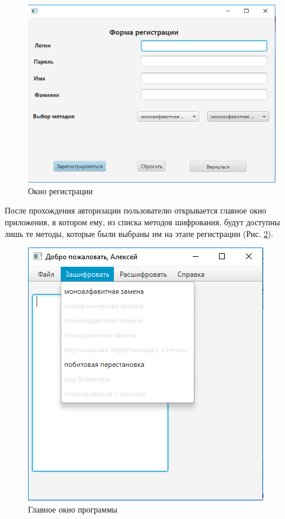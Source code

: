 \documentclass[a4paper,12pt]{article}
\begin{document}
\begin{center}
	\begin{figure}[h!]
		\centering
   		\includegraphics[scale=0.5]{img/registry_form.png}
   		\caption{Окно регистрации}
   		\label{fig:registry_form}
    \end{figure}
\end{center}
После прохождения авторизации пользователю открывается главное окно приложения, в котором ему, из списка методов шифрования, будут доступны лишь те методы, которые были выбраны им на этапе регистрации (Рис. \ref{fig:main_form}).
\begin{center}
	\begin{figure}[h!]
		\centering
   		\includegraphics[scale=0.5]{img/main_form.png}
   		\caption{Главное окно программы}
   		\label{fig:main_form}
    \end{figure}
\end{center}
\end{document}
